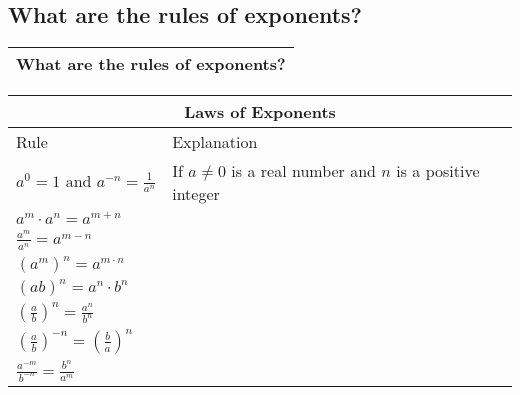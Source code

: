 
\subsection{What are the rules of exponents?}

\begin{small}
    \begin{tabularx}{1\textwidth}{
            p{}
        }
        \toprule
        What are the rules of exponents?
        \\
        \bottomrule

    \end{tabularx}
\end{small}


\begin{small}
\begin{tabularx}{1\textwidth}{
    p{}
    p{}
}
\toprule
\multicolumn{2}{c}{\textbf{Laws of Exponents}} \\
\midrule

Rule & Explanation \\
\midrule

$ a^{0} = 1 \text{ and } a^{-n}  = \frac{1}{a^{n}} $
&
If $a \neq 0$ is a real number and $n$ is a positive integer
\\

\midrule

$ a^{m} \cdot a^{n} = a^{m + n} $ & \\
\midrule

$ \frac{a^{m}}{a^{n}} = a^{m-n} $ & \\
\midrule

$ \left( a^{m} \right)^{n} = a^{m \cdot n} $ & \\
\midrule

$ \left( ab \right)^{n} = a^{n} \cdot b^{n} $ & \\
\midrule

$ \left( \frac{a}{b} \right) ^{n} = \frac{a^{n}}{b^{n}} $ & \\
\midrule

$ \left( \frac{a}{b} \right)^{-n} = \left( \frac{b}{a} \right)^{n} $ & \\
\midrule

$ \frac{a^{-m}}{b^{-n}} = \frac{b^{n}}{a^{m}} $ & \\
\bottomrule

\end{tabularx}
\end{small}
